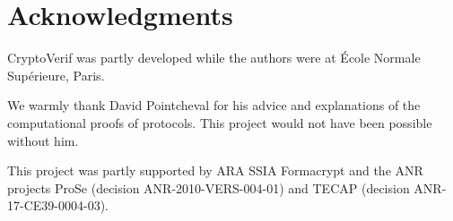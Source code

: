 \documentclass{article}
\begin{document}
\section*{Acknowledgments}

CryptoVerif was partly developed while the authors were at \'Ecole Normale Sup\'erieure, Paris.

We warmly thank David Pointcheval for his advice and explanations
of the computational proofs of protocols. This project would not have
been possible without him.

This project was partly supported by ARA SSIA Formacrypt and
the ANR projects ProSe (decision ANR-2010-VERS-004-01)
and TECAP (decision ANR-17-CE39-0004-03).


\end{document}
